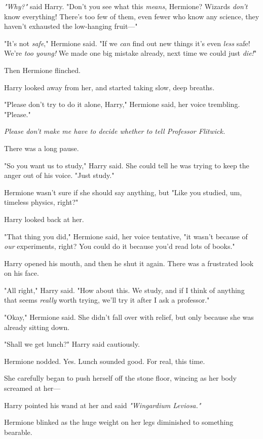\emph{"Why?"} said Harry. "Don't you see what this \emph{means}, Hermione?
Wizards \emph{don't} know everything! There's too few of them, even fewer who
know any science, they haven't exhausted the low-hanging fruit\mbox{---}"

"It's not \emph{safe}," Hermione said. "If we \emph{can} find out new things
it's even \emph{less} safe! We're \emph{too young!} We made one big mistake
already, next time we could just \emph{die!}"

Then Hermione flinched.

Harry looked away from her, and started taking slow, deep breaths.

"Please don't try to do it alone, Harry," Hermione said, her voice trembling.
"Please."

\emph{Please don't make me have to decide whether to tell Professor Flitwick.}

There was a long pause.

"So you want us to study," Harry said. She could tell he was trying to keep the
anger out of his voice. "Just study."

Hermione wasn't sure if she should say anything, but{\el} "Like you studied,
um, timeless physics, right?"

Harry looked back at her.

"That thing you did," Hermione said, her voice tentative, "it wasn't because of
\emph{our} experiments, right? You could do it because you'd read lots of
books."

Harry opened his mouth, and then he shut it again. There was a frustrated look
on his face.

"All right," Harry said. "How about this. We study, and if I think of anything
that seems \emph{really} worth trying, we'll try it after I ask a professor."

"Okay," Hermione said. She didn't fall over with relief, but only because she
was already sitting down.

"Shall we get lunch?" Harry said cautiously.

Hermione nodded. Yes. Lunch sounded good. For real, this time.

She carefully began to push herself off the stone floor, wincing as her body
screamed at her\mbox{---}

Harry pointed his wand at her and said \emph{"Wingardium Leviosa."}

Hermione blinked as the huge weight on her legs diminished to something
bearable.


